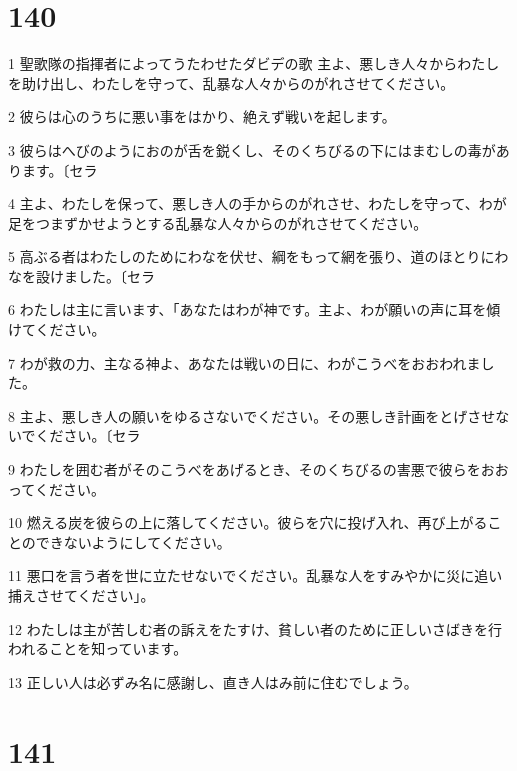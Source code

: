 \chapter{140}

\par 1 聖歌隊の指揮者によってうたわせたダビデの歌 主よ、悪しき人々からわたしを助け出し、わたしを守って、乱暴な人々からのがれさせてください。
\par 2 彼らは心のうちに悪い事をはかり、絶えず戦いを起します。
\par 3 彼らはへびのようにおのが舌を鋭くし、そのくちびるの下にはまむしの毒があります。〔セラ
\par 4 主よ、わたしを保って、悪しき人の手からのがれさせ、わたしを守って、わが足をつまずかせようとする乱暴な人々からのがれさせてください。
\par 5 高ぶる者はわたしのためにわなを伏せ、綱をもって網を張り、道のほとりにわなを設けました。〔セラ
\par 6 わたしは主に言います、「あなたはわが神です。主よ、わが願いの声に耳を傾けてください。
\par 7 わが救の力、主なる神よ、あなたは戦いの日に、わがこうべをおおわれました。
\par 8 主よ、悪しき人の願いをゆるさないでください。その悪しき計画をとげさせないでください。〔セラ
\par 9 わたしを囲む者がそのこうべをあげるとき、そのくちびるの害悪で彼らをおおってください。
\par 10 燃える炭を彼らの上に落してください。彼らを穴に投げ入れ、再び上がることのできないようにしてください。
\par 11 悪口を言う者を世に立たせないでください。乱暴な人をすみやかに災に追い捕えさせてください」。
\par 12 わたしは主が苦しむ者の訴えをたすけ、貧しい者のために正しいさばきを行われることを知っています。
\par 13 正しい人は必ずみ名に感謝し、直き人はみ前に住むでしょう。

\chapter{141}

